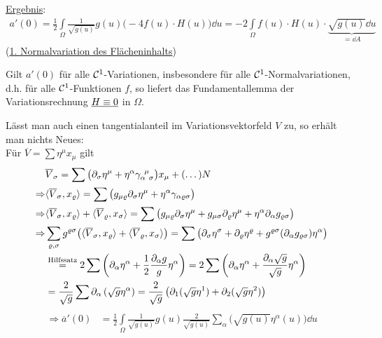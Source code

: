 \begin{beweis}
\uline{Ergebnis}:
\begin{align*}
 a'(0) = \frac12 \int\limits_\Omega \frac{1}{\sqrt{g(u)}} g(u) \big(-4 f(u) \cdot H(u)\big) \dd u = -2 \int\limits_\Omega f(u) \cdot H(u) \cdot \underbrace{\sqrt{g(u)} \dd u}_{= \dd A}
\end{align*}
(\uline{1. Normalvariation des Flächeninhalts})\par
Gilt \(a'(0)\) für alle \(\mathcal{C}^1\)-Variationen, insbesondere für alle \(\mathcal{C}^1\)-Normalvariationen, d.h. für alle \(\mathcal{C}^1\)-Funktionen \(f\), so liefert das Fundamentallemma der Variationsrechnung \(\uline{H \equiv 0}\) in \(\Omega\). \par
Lässt man auch einen tangentialanteil im Variationsvektorfeld \(V\) zu, so erhält man nichts Neues:\\
Für \(\overline V = \sum \eta^\mu x_\mu\) gilt
\begin{align*}
 &\overline V_\sigma = \sum \big(\partial_\sigma \eta^\mu + \eta^\alpha \gamma_{\alpha \;\, \sigma}^{\;\, \mu} \big) x_\mu + (\dots) N \\
 \Rightarrow & \langle \overline V_\sigma, x_\varrho \rangle = \sum \big(g_{\mu \varrho} \partial_\sigma \eta^\mu + \eta^\alpha \gamma_{\alpha \varrho \sigma}\big) \\
 \Rightarrow & \langle \overline V_\sigma, x_\varrho \rangle + \langle \overline V_\varrho, x_\sigma \rangle = \sum \big( g_{\mu \varrho} \partial_\sigma \eta^\mu + g_{\mu \sigma} \partial_\varrho \eta^\mu + \eta^\alpha \partial_\alpha g_{\varrho \sigma}\big) \\
 \Rightarrow &\sum_{\varrho, \sigma} g^{\varrho \sigma} \big(\langle \overline V_\sigma, x_\varrho \rangle + \langle \overline V_\varrho, x_\sigma \rangle \big) = \sum \big(\partial_\sigma \eta^\sigma + \partial_\varrho \eta^\varrho + g^{\varrho \sigma} (\partial_\alpha g_{\varrho \sigma}) \eta^{\alpha}\big) \\
 &\stackrel{\text{Hilfssatz}}{=} 2 \sum \left(\partial_\alpha \eta^\alpha + \frac12 \frac{\partial_\alpha g}{g} \eta^\alpha \right) = 2 \sum \left( \partial_\alpha \eta^\alpha + \frac{\partial_\alpha \sqrt{g}}{\sqrt{g}} \eta^\alpha \right) \\
 &= \frac2{\sqrt{g}} \sum \partial_\alpha \left(\sqrt{g} \eta^\alpha \right) = \frac2{\sqrt{g}} \left( \partial_1 (\sqrt{g} \eta^1) + \partial_2(\sqrt{g} \eta^2)\right) \\
\end{align*}
\begin{align*}
 \Rightarrow  \overline a'(0) &= \frac12 \int\limits_\Omega \frac{1}{\sqrt{g(u)}} g(u) \frac{2}{\sqrt{g(u)}} \sum_\alpha \big(\sqrt{g(u)} \eta^\alpha(u)\big) \dd u \\

\end{align*}
\end{beweis}
